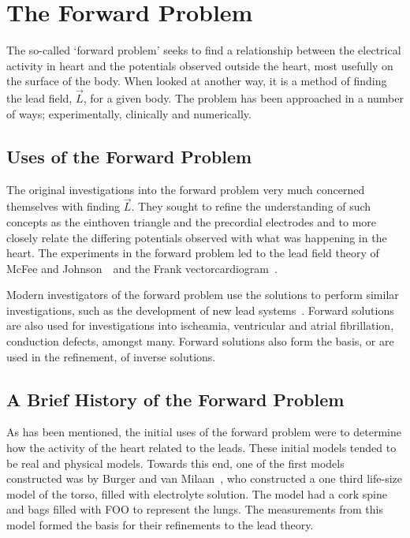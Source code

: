 \section{The Forward Problem}

The so-called `forward problem' seeks to find a relationship between the
electrical activity in heart and the potentials observed outside the heart,
most usefully on the surface of the body.
When looked at another way, it is a method of finding the lead field, $\vec{L}$,
for a given body.
The problem has been approached in a number of ways; experimentally, clinically
and numerically.

\subsection{Uses of the Forward Problem}

The original investigations into the forward problem very much concerned
themselves with finding $\vec{L}$.
They sought to refine the understanding of such concepts as the einthoven
triangle and the precordial electrodes and to more closely relate the differing
potentials observed with what was happening in the heart.
The experiments in the forward problem led to the lead field theory of McFee and
Johnson~\cite{McFee1953}\ and the Frank vectorcardiogram~\cite{Frank1956}.

Modern investigators of the forward problem use the solutions to perform similar
investigations, such as the development of new lead systems~\cite{Ihara2007}.
Forward solutions are also used for investigations into ischeamia, ventricular
and atrial fibrillation, conduction defects, amongst many.
Forward solutions also form the basis, or are used in the refinement, of inverse
solutions.

\subsection{A Brief History of the Forward Problem}

As has been mentioned, the initial uses of the forward problem were to determine
how the activity of the heart related to the leads.
These initial models tended to be real and physical models.
Towards this end, one of the first models constructed was by Burger and van
Milaan~\cite{Burger1946}, who constructed a one third life-size model of the
torso, filled with electrolyte solution.
The model had a cork spine and bags filled with FOO to represent the lungs.
The measurements from this model formed the basis for their refinements to the
lead theory.




